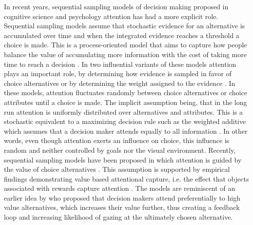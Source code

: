 In recent years, sequential sampling models of decision making proposed in cognitive science and psychology attention has had a more explicit role. Sequential sampling models assume that stochastic evidence for an alternative is accumulated over time and when the integrated evidence reaches a threshold a choice is made. This is a process-oriented model that aims to capture how people balance the value of accumulating more information with the cost of taking more time to reach a decision \citep{forstmann2016}. In two influential variants of these models attention plays an important role, by determining how evidence is sampled in favor of choice alternatives \citep{busemeyer1992} or by determining the weight assigned to the evidence \citep{krajbich2010a, thomas2019}. In these models, attention fluctuates randomly between choice alternatives or choice attributes until a choice is made. The implicit assumption being, that in the long run attention is uniformly distributed over alternatives and attributes. This is a stochastic equivalent to a maximizing decision rule such as the weighted additive which assumes that a decision maker attends equally to all information \cite{gloeckner2011a, payne1988}. In other words, even though attention exerts an influence on choice, this influence is random and neither controlled by goals nor the visual environment. Recently, sequential sampling models have been proposed in which attention is guided by the value of choice alternatives \citep{callaway2019a, gluth2018, gluth2020}. This assumption is supported by empirical findings demonstrating value based attentional capture, i.e. the effect that objects associated with rewards capture attention \citep{lepelley2015}. The models are reminiscent of an earlier idea by \cite{shimojo2003a} who proposed that decision makers attend preferentially to high value alternatives, which increases their value further, thus creating a feedback loop and increasing likelihood of gazing at the ultimately chosen alternative.\\ 

